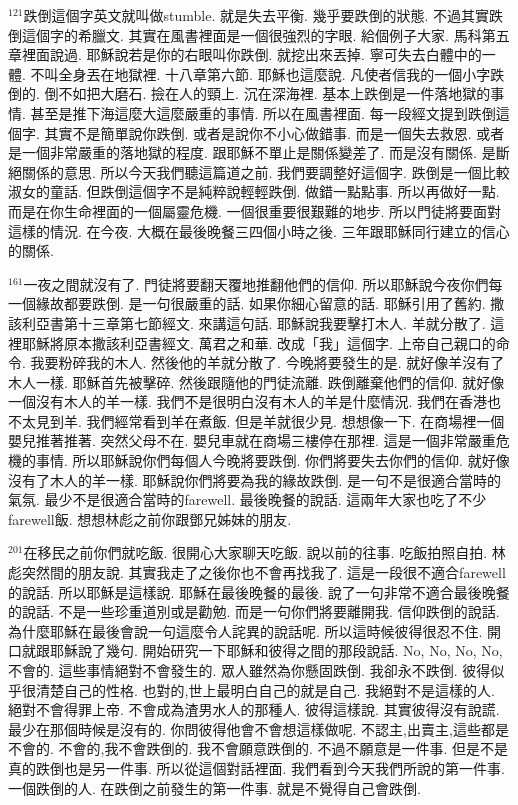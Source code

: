 \documentclass{book}
\begin{document}
$^{121}$跌倒這個字英文就叫做stumble.
就是失去平衡.
幾乎要跌倒的狀態.
不過其實跌倒這個字的希臘文.
其實在風書裡面是一個很強烈的字眼.
給個例子大家.
馬科第五章裡面說過.
耶穌說若是你的右眼叫你跌倒.
就挖出來丟掉.
寧可失去白體中的一體.
不叫全身丟在地獄裡.
十八章第六節.
耶穌也這麼說.
凡使者信我的一個小字跌倒的.
倒不如把大磨石.
撿在人的頸上.
沉在深海裡.
基本上跌倒是一件落地獄的事情.
甚至是推下海這麼大這麼嚴重的事情.
所以在風書裡面.
每一段經文提到跌倒這個字.
其實不是簡單說你跌倒.
或者是說你不小心做錯事.
而是一個失去救恩.
或者是一個非常嚴重的落地獄的程度.
跟耶穌不單止是關係變差了.
而是沒有關係.
是斷絕關係的意思.
所以今天我們聽這篇道之前.
我們要調整好這個字.
跌倒是一個比較淑女的童話.
但跌倒這個字不是純粹說輕輕跌倒.
做錯一點點事.
所以再做好一點.
而是在你生命裡面的一個屬靈危機.
一個很重要很艱難的地步.
所以門徒將要面對這樣的情況.
在今夜.
大概在最後晚餐三四個小時之後.
三年跟耶穌同行建立的信心的關係.

$^{161}$一夜之間就沒有了.
門徒將要翻天覆地推翻他們的信仰.
所以耶穌說今夜你們每一個緣故都要跌倒.
是一句很嚴重的話.
如果你細心留意的話.
耶穌引用了舊約.
撒該利亞書第十三章第七節經文.
來講這句話.
耶穌說我要擊打木人.
羊就分散了.
這裡耶穌將原本撒該利亞書經文.
萬君之和華.
改成「我」這個字.
上帝自己親口的命令.
我要粉碎我的木人.
然後他的羊就分散了.
今晚將要發生的是.
就好像羊沒有了木人一樣.
耶穌首先被擊碎.
然後跟隨他的門徒流離.
跌倒離棄他們的信仰.
就好像一個沒有木人的羊一樣.
我們不是很明白沒有木人的羊是什麼情況.
我們在香港也不太見到羊.
我們經常看到羊在煮飯.
但是羊就很少見.
想想像一下.
在商場裡一個嬰兒推著推著.
突然父母不在.
嬰兒車就在商場三樓停在那裡.
這是一個非常嚴重危機的事情.
所以耶穌說你們每個人今晚將要跌倒.
你們將要失去你們的信仰.
就好像沒有了木人的羊一樣.
耶穌說你們將要為我的緣故跌倒.
是一句不是很適合當時的氣氛.
最少不是很適合當時的farewell.
最後晚餐的說話.
這兩年大家也吃了不少farewell飯.
想想林彪之前你跟鄧兄姊妹的朋友.

$^{201}$在移民之前你們就吃飯.
很開心大家聊天吃飯.
說以前的往事.
吃飯拍照自拍.
林彪突然間的朋友說.
其實我走了之後你也不會再找我了.
這是一段很不適合farewell的說話.
所以耶穌是這樣說.
耶穌在最後晚餐的最後.
說了一句非常不適合最後晚餐的說話.
不是一些珍重道別或是勸勉.
而是一句你們將要離開我.
信仰跌倒的說話.
為什麼耶穌在最後會說一句這麼令人詫異的說話呢.
所以這時候彼得很忍不住.
開口就跟耶穌說了幾句.
開始研究一下耶穌和彼得之間的那段說話.
No, No, No, No, 不會的.
這些事情絕對不會發生的.
眾人雖然為你懸固跌倒.
我卻永不跌倒.
彼得似乎很清楚自己的性格.
也對的,世上最明白自己的就是自己.
我絕對不是這樣的人.
絕對不會得罪上帝.
不會成為渣男水人的那種人.
彼得這樣說.
其實彼得沒有說謊.
最少在那個時候是沒有的.
你問彼得他會不會想這樣做呢.
不認主,出賣主,這些都是不會的.
不會的,我不會跌倒的.
我不會願意跌倒的.
不過不願意是一件事.
但是不是真的跌倒也是另一件事.
所以從這個對話裡面.
我們看到今天我們所說的第一件事.
一個跌倒的人.
在跌倒之前發生的第一件事.
就是不覺得自己會跌倒.
\end{document}
